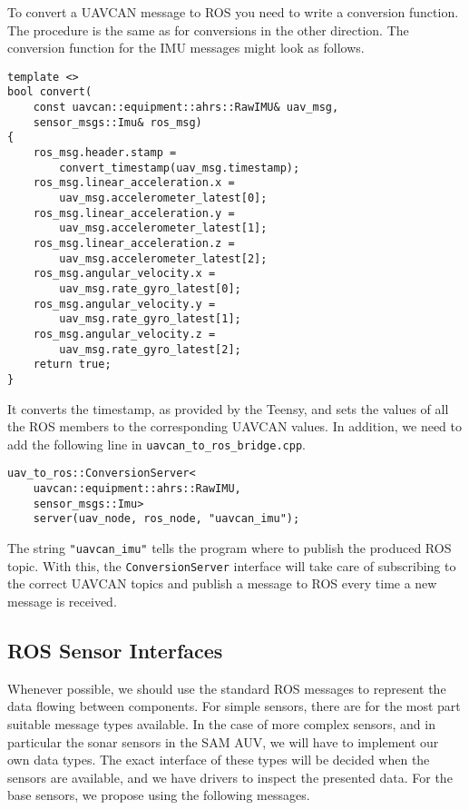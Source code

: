 \documentclass[9pt,technote]{IEEEtran} %
\begin{document}
To convert a UAVCAN message to ROS you need to write a conversion
function. The procedure is the same as for conversions in the
other direction. The conversion function for the IMU messages
might look as follows.
\begin{scriptsize}
\begin{verbatim}
template <>
bool convert(
    const uavcan::equipment::ahrs::RawIMU& uav_msg,
    sensor_msgs::Imu& ros_msg)
{
    ros_msg.header.stamp =
        convert_timestamp(uav_msg.timestamp);
    ros_msg.linear_acceleration.x =
        uav_msg.accelerometer_latest[0];
    ros_msg.linear_acceleration.y =
        uav_msg.accelerometer_latest[1];
    ros_msg.linear_acceleration.z =
        uav_msg.accelerometer_latest[2];
    ros_msg.angular_velocity.x =
        uav_msg.rate_gyro_latest[0];
    ros_msg.angular_velocity.y =
        uav_msg.rate_gyro_latest[1];
    ros_msg.angular_velocity.z =
        uav_msg.rate_gyro_latest[2];
    return true;
}
\end{verbatim}
\end{scriptsize}
It converts the timestamp, as provided by the Teensy,
and sets the values of all the ROS members to the corresponding
UAVCAN values. In addition, we need to add the following
line in \texttt{uavcan\_to\_ros\_bridge.cpp}.
\begin{scriptsize}
\begin{verbatim}
uav_to_ros::ConversionServer<
    uavcan::equipment::ahrs::RawIMU,
    sensor_msgs::Imu>
    server(uav_node, ros_node, "uavcan_imu");
\end{verbatim}
\end{scriptsize}
The string \texttt{"uavcan\_imu"} tells the program where to
publish the produced ROS topic. With this, the \texttt{ConversionServer}
interface will take care of subscribing to the correct UAVCAN topics
and publish a message to ROS every time a new message is received.

\subsection{ROS Sensor Interfaces}
\label{sensors}

Whenever possible, we should use the standard ROS messages
to represent the data flowing between components.
For simple sensors, there are for the most part suitable
message types available. In the case of more complex sensors,
and in particular the sonar sensors in the SAM AUV, we will
have to implement our own data types. The exact interface
of these types will be decided when the sensors are available, and
we have drivers to inspect the presented data.
For the base sensors, we propose using the following messages.
\end{document}
